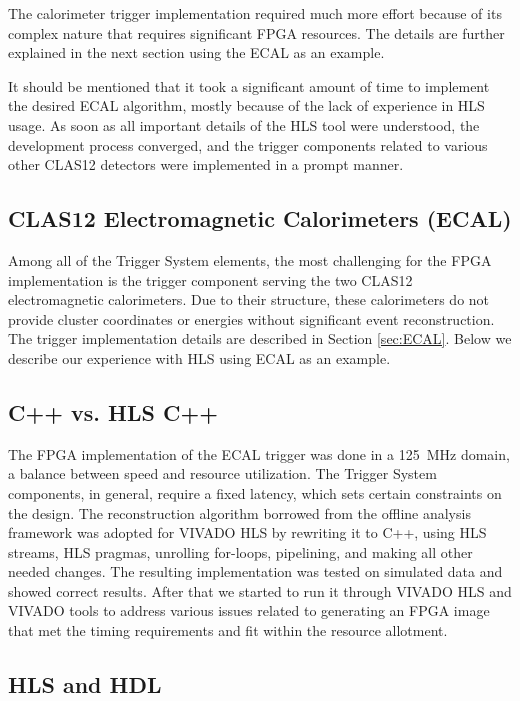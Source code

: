 The calorimeter trigger implementation required much more effort because of its complex nature that requires significant FPGA resources. The details are further explained in the next section using the ECAL as an example.

It should be mentioned that it took a significant amount of time to implement the desired ECAL algorithm, mostly because of the lack of experience in HLS usage. As soon as all important details of the HLS tool were understood, the development process converged, and the trigger components related to various other CLAS12 detectors were implemented in a prompt manner.


\subsection{CLAS12 Electromagnetic Calorimeters (ECAL)}

Among all of the Trigger System elements, the most challenging for the FPGA implementation is the trigger component serving the two CLAS12 electromagnetic calorimeters. Due to their structure, these calorimeters do not provide cluster coordinates or energies without significant event reconstruction. The trigger implementation details are described in Section \ref{sec:ECAL}. Below we describe our experience with HLS using ECAL as an example.


\subsection{C++ vs. HLS C++}

The FPGA implementation of the ECAL trigger was done in a 125~MHz domain, a balance between speed and resource utilization. The Trigger System components, in general, require a fixed latency, which sets certain constraints on the design. The reconstruction algorithm borrowed from the offline analysis framework was adopted for VIVADO HLS by rewriting it to C++, using HLS streams, HLS pragmas, unrolling for-loops, pipelining, and making all other needed changes. The resulting implementation was tested on simulated data and showed correct results. After that we started to run it through VIVADO HLS and VIVADO tools to address various issues related to generating an FPGA image that met the timing requirements and fit within the resource allotment.


\subsection{HLS and HDL}

